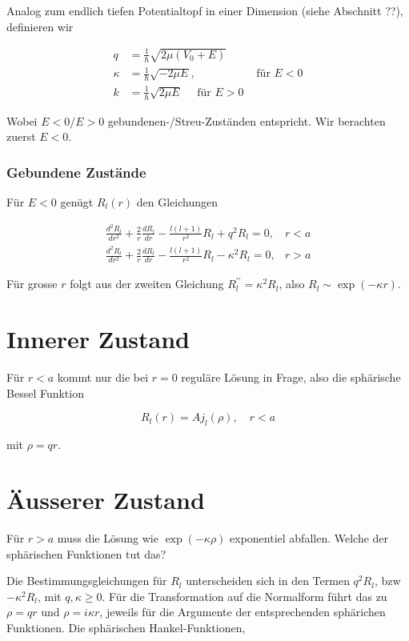 \documentclass[10pt, letterpaper]{article}
\begin{document}
Analog zum endlich tiefen Potentialtopf in einer Dimension (siehe Abschnitt ??), definieren wir

$$
\begin{array}{rlr}
q & =\frac{1}{\hbar} \sqrt{2 \mu\left(V_{0}+E\right)} & \\
\kappa & =\frac{1}{\hbar} \sqrt{-2 \mu E}, & \text { für } E<0 \\
k & =\frac{1}{\hbar} \sqrt{2 \mu E} \quad \text { für } E>0
\end{array}
$$

Wobei $E<0 / E>0$ gebundenen-/Streu-Zuständen entspricht. Wir berachten zuerst $E<0$.

\subsubsection*{Gebundene Zustände}
Für $E<0$ genügt $R_{l}(r)$ den Gleichungen

$$
\begin{array}{ll}
\frac{d^{2} R_{l}}{d r^{2}}+\frac{2}{r} \frac{d R_{l}}{d r}-\frac{l(l+1)}{r^{2}} R_{l}+q^{2} R_{l}=0, & r<a \\
\frac{d^{2} R_{l}}{d r^{2}}+\frac{2}{r} \frac{d R_{l}}{d r}-\frac{l(l+1)}{r^{2}} R_{l}-\kappa^{2} R_{l}=0, & r>a
\end{array}
$$

Für grosse $r$ folgt aus der zweiten Gleichung $R_{l}^{\prime \prime}=\kappa^{2} R_{l}$, also $R_{l} \sim \exp (-\kappa r)$.

\section*{Innerer Zustand}
Für $r<a$ kommt nur die bei $r=0$ reguläre Lösung in Frage, also die sphärische Bessel Funktion

$$
R_{l}(r)=A j_{l}(\rho), \quad r<a
$$

mit $\rho=q r$.

\section*{Äusserer Zustand}
Für $r>a$ muss die Lösung wie $\exp (-\kappa \rho)$ exponentiel abfallen. Welche der sphärischen Funktionen tut das?

Die Bestimmungsgleichungen für $R_{l}$ unterscheiden sich in den Termen $q^{2} R_{l}$, bzw $-\kappa^{2} R_{l}$, mit $q, \kappa \geq 0$. Für die Transformation auf die Normalform führt das zu $\rho=q r$ und $\rho=i \kappa r$, jeweils für die Argumente der entsprechenden sphärichen Funktionen. Die sphärischen Hankel-Funktionen,
\end{document}
